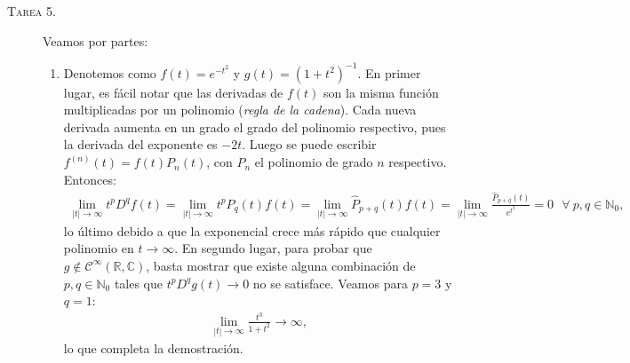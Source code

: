 \documentclass[spanish, fleqn]{article}
\begin{document}
\begin{description}
\begin{enumerate}
	\end{enumerate}




	\item[\textsc{Tarea 5.}] Veamos por partes:
	\begin{enumerate}
		\item Denotemos como $\displaystyle f(t)=e^{-t^2}$ y $\displaystyle g(t)=(1+t^2)^{-1}$. En primer lugar, es fácil notar que las derivadas de $f(t)$ son la misma función multiplicadas por un polinomio (\textit{regla de la cadena}). Cada nueva derivada aumenta en un grado el grado del polinomio respectivo, pues la derivada del exponente es $-2t$.
		Luego se puede escribir $f^{(n)}(t)=f(t)P_n(t)$, con $P_n$ el polinomio de grado $n$ respectivo. Entonces:
		\begin{align*}
			\lim_{|t|\rightarrow \infty} t^p D^q f(t) = \lim_{|t|\rightarrow \infty} t^p P_q(t) f(t) = \lim_{|t|\rightarrow \infty} \widehat{P}_{p+q}(t) f(t) = \lim_{|t|\rightarrow \infty} \frac{\widehat{P}_{p+q}(t)}{e^{t^2}} = 0 \ \ \ \forall \ p,q \in \mathbb{N}_0,
		\end{align*}
		lo último debido a que la exponencial crece más rápido que cualquier polinomio en $t \rightarrow \infty$. En segundo lugar, para probar que $g \notin \mathcal{C}^{\infty}(\mathbb{R},\mathbb{C})$, basta mostrar que existe alguna combinación de $p,q \in \mathbb{N}_0$ tales que $t^p D^q g(t) \rightarrow 0$ no se satisface. Veamos para $p=3$ y $q=1$:
		\begin{align*}
			\lim_{|t|\rightarrow \infty} \frac{t^3}{1+t^2} \rightarrow \infty,
		\end{align*}
		lo que completa la demostración.


\end{enumerate}
\end{description}
\end{document}
